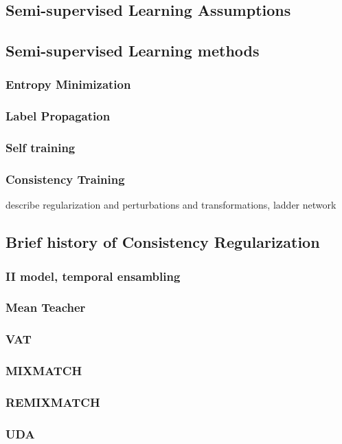 \documentclass[11pt,oneside,a4paper]{book}
\theoremstyle{definition}
\DeclareRobustCommand{\[}{\begin{equation}}
\DeclareRobustCommand{\]}{\end{equation}}
\begin{document}
        \subsection{Semi-supervised Learning Assumptions}
        \subsection{Semi-supervised Learning methods}
            \subsubsection{Entropy Minimization}
            \subsubsection{Label Propagation}
            \subsubsection{Self training}
            \subsubsection{Consistency Training}
                describe regularization and perturbations and transformations, ladder network
        \subsection{Brief history of Consistency Regularization}
             \subsubsection{II model, temporal ensambling}
             \subsubsection{Mean Teacher}
             \subsubsection{VAT}
             \subsubsection{MIXMATCH}
             \subsubsection{REMIXMATCH}
             \subsubsection{UDA}
\end{document}
